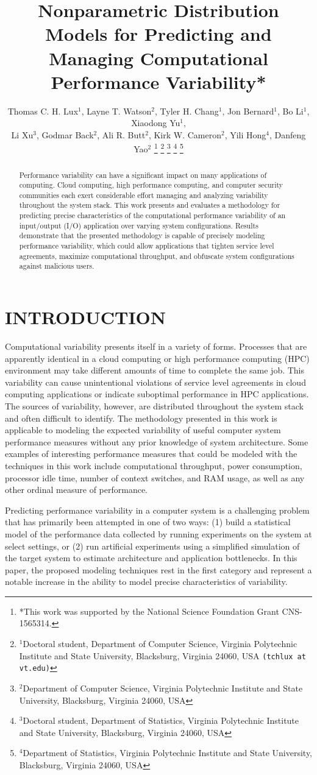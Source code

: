 \documentclass[letterpaper, 10 pt, conference]{ieeeconf}  %
\title{\LARGE \bf Nonparametric Distribution Models for Predicting and
  \\ Managing Computational Performance Variability* }
\author{Thomas C. H. Lux$^{1}$, Layne T. Watson$^{2}$, Tyler H. Chang$^{1}$, Jon Bernard$^{1}$, Bo Li$^{1}$, Xiaodong Yu$^{1}$,\\ Li Xu$^{3}$, Godmar Back$^{2}$, Ali R. Butt$^{2}$, Kirk W. Cameron$^{2}$, Yili Hong$^{4}$, Danfeng Yao$^{2}$%
\thanks{*This work was supported by the National Science Foundation Grant CNS-1565314.}%
\thanks{$^{1}$Doctoral student, Department of Computer Science, Virginia Polytechnic Institute and State University, Blacksburg, Virginia 24060, USA {\tt\small (tchlux at vt.edu)}}%
\thanks{$^{2}$Department of Computer Science, Virginia Polytechnic Institute and State University, Blacksburg, Virginia 24060, USA}%
\thanks{$^{3}$Doctoral student, Department of Statistics, Virginia Polytechnic Institute and State University, Blacksburg, Virginia 24060, USA}%
\thanks{$^{4}$Department of Statistics, Virginia Polytechnic Institute and State University, Blacksburg, Virginia 24060, USA}%
}
\begin{document}
\maketitle
\thispagestyle{empty}
\pagestyle{empty}

\begin{abstract}
Performance variability can have a significant impact on many applications of computing. Cloud computing, high performance computing, and computer security communities each exert considerable effort managing and analyzing variability throughout the system stack. This work presents and evaluates a methodology for predicting precise characteristics of the computational performance variability of an input/output (I/O) application over varying system configurations. Results demonstrate that the presented methodology is capable of precisely modeling performance variability, which could allow applications that tighten service level agreements, maximize computational throughput, and obfuscate system configurations against malicious users.
\end{abstract}

\section{INTRODUCTION}
\label{sec:introduction}

Computational variability presents itself in a variety of forms. Processes that are apparently identical in a cloud computing or high performance computing (HPC) environment may take different amounts of time to complete the same job. This variability can cause unintentional violations of service level agreements in cloud computing applications or indicate suboptimal performance in HPC applications. The sources of variability, however, are distributed throughout the system stack and often difficult to identify. The methodology presented in this work is applicable to modeling the expected variability of useful computer system performance measures without any prior knowledge of system architecture. Some examples of interesting performance measures that could be modeled with the techniques in this work include computational throughput, power consumption, processor idle time, number of context switches, and RAM usage, as well as any other ordinal measure of performance.

Predicting performance variability in a computer system is a challenging problem that has primarily been attempted in one of two ways: (1) build a statistical model of the performance data collected by running experiments on the system at select settings, or (2) run artificial experiments using a simplified simulation of the target system to estimate architecture and application bottlenecks. In this paper, the proposed modeling techniques rest in the first category and represent a notable increase in the ability to model precise characteristics of variability.
\end{document}
